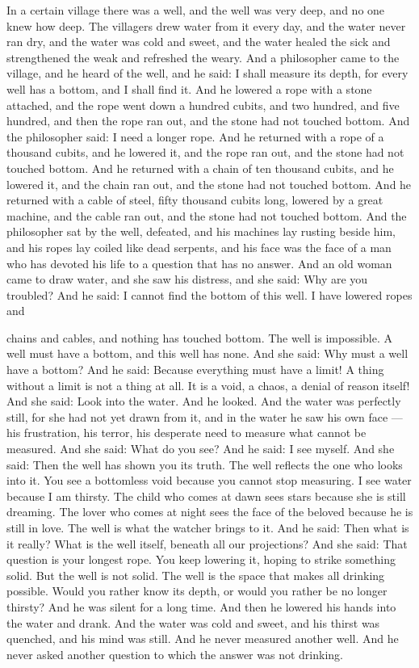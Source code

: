 \documentclass[12pt,openany]{book}
\begin{document}
In a certain village there was a well, and the well was very deep, and no one knew how deep. The villagers drew water from it every day, and the water never ran dry, and the water was cold and sweet, and the water healed the sick and strengthened the weak and refreshed the weary. And a philosopher came to the village, and he heard of the well, and he said: I shall measure its depth, for every well has a bottom, and I shall find it. And he lowered a rope with a stone attached, and the rope went down a hundred cubits, and two hundred, and five hundred, and then the rope ran out, and the stone had not touched bottom. And the philosopher said: I need a longer rope. And he returned with a rope of a thousand cubits, and he lowered it, and the rope ran out, and the stone had not touched bottom. And he returned with a chain of ten thousand cubits, and he lowered it, and the chain ran out, and the stone had not touched bottom. And he returned with a cable of steel, fifty thousand cubits long, lowered by a great machine, and the cable ran out, and the stone had not touched bottom. And the philosopher sat by the well, defeated, and his machines lay rusting beside him, and his ropes lay coiled like dead serpents, and his face was the face of a man who has devoted his life to a question that has no answer. And an old woman came to draw water, and she saw his distress, and she said: Why are you troubled? And he said: I cannot find the bottom of this well. I have lowered ropes and


chains and cables, and nothing has touched bottom. The well is impossible. A well must have a bottom, and this well has none. And she said: Why must a well have a bottom? And he said: Because everything must have a limit! A thing without a limit is not a thing at all. It is a void, a chaos, a denial of reason itself! And she said: Look into the water. And he looked. And the water was perfectly still, for she had not yet drawn from it, and in the water he saw his own face --- his frustration, his terror, his desperate need to measure what cannot be measured. And she said: What do you see? And he said: I see myself. And she said: Then the well has shown you its truth. The well reflects the one who looks into it. You see a bottomless void because you cannot stop measuring. I see water because I am thirsty. The child who comes at dawn sees stars because she is still dreaming. The lover who comes at night sees the face of the beloved because he is still in love. The well is what the watcher brings to it. And he said: Then what is it really? What is the well itself, beneath all our projections? And she said: That question is your longest rope. You keep lowering it, hoping to strike something solid. But the well is not solid. The well is the space that makes all drinking possible. Would you rather know its depth, or would you rather be no longer thirsty? And he was silent for a long time. And then he lowered his hands into the water and drank. And the water was cold and sweet, and his thirst was quenched, and his mind was still. And he never measured another well. And he never asked another question to which the answer was not drinking.
\end{document}
